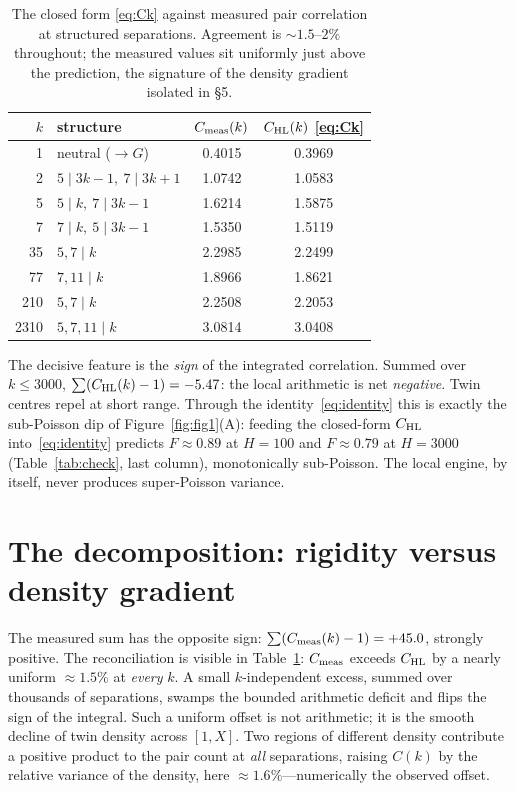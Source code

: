 \documentclass[11pt]{article}
\theoremstyle{definition}
\begin{document}
\begin{table}[t]
\centering\small
\begin{tabular}{rlcc}
\toprule
$k$ & structure & $C_{\rm meas}(k)$ & $C_{\rm HL}(k)$ \eqref{eq:Ck}\\
\midrule
1    & neutral ($\to G$)        & 0.4015 & 0.3969\\
2    & $5\mid 3k\!-\!1,\ 7\mid 3k\!+\!1$ & 1.0742 & 1.0583\\
5    & $5\mid k,\ 7\mid 3k\!-\!1$ & 1.6214 & 1.5875\\
7    & $7\mid k,\ 5\mid 3k\!-\!1$ & 1.5350 & 1.5119\\
35   & $5,7\mid k$              & 2.2985 & 2.2499\\
77   & $7,11\mid k$             & 1.8966 & 1.8621\\
210  & $5,7\mid k$              & 2.2508 & 2.2053\\
2310 & $5,7,11\mid k$           & 3.0814 & 3.0408\\
\bottomrule
\end{tabular}
\caption{The closed form \eqref{eq:Ck} against measured pair correlation at structured separations.
Agreement is $\sim1.5$--$2\%$ throughout; the measured values sit uniformly just above the prediction,
the signature of the density gradient isolated in \S5.}
\label{tab:Ck}
\end{table}

The decisive feature is the \emph{sign} of the integrated correlation. Summed over $k\le3000$,
$\sum(C_{\rm HL}(k)-1)=-5.47$: the local arithmetic is net \emph{negative}. Twin centres repel at
short range. Through the identity~\eqref{eq:identity} this is exactly the sub-Poisson dip of
Figure~\ref{fig:fig1}(A): feeding the closed-form $C_{\rm HL}$ into~\eqref{eq:identity} predicts
$F\approx0.89$ at $H=100$ and $F\approx0.79$ at $H=3000$ (Table~\ref{tab:check}, last column),
monotonically sub-Poisson. The local engine, by itself, never produces super-Poisson variance.

\section{The decomposition: rigidity versus density gradient}
The measured sum has the opposite sign: $\sum(C_{\rm meas}(k)-1)=+45.0$, strongly positive. The
reconciliation is visible in Table~\ref{tab:Ck}: $C_{\rm meas}$ exceeds $C_{\rm HL}$ by a nearly
uniform $\approx1.5\%$ at \emph{every} $k$. A small $k$-independent excess, summed over thousands of
separations, swamps the bounded arithmetic deficit and flips the sign of the integral. Such a uniform
offset is not arithmetic; it is the smooth decline of twin density across $[1,X]$. Two regions of
different density contribute a positive product to the pair count at \emph{all} separations, raising
$C(k)$ by the relative variance of the density, here $\approx1.6\%$---numerically the observed offset.
\end{document}
